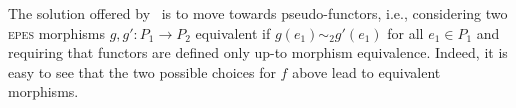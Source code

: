 \documentclass[conference]{IEEEtran}
\newcommand{\ir}[1]{\ensuremath{\mathop{\mathit{ir}({#1})}}}
\newcommand{\diff}[2]{\ensuremath{\delta({#1},{#2})}}
\newcommand{\eseqabbr}{\textsc{epes}}
\newcommand{\pred}[1]{\ensuremath{\mathit{p}({#1})}}
\newcommand{\zeveq}[0]{\ensuremath{\mathcal{E}_{eq}}}
\newcommand{\eveq}[1]{\ensuremath{\zeveq({#1})}}
\newcommand{\conf}[1]{\ensuremath{\mathit{Conf}({#1})}}
\newcommand{\zdomeq}[0]{\ensuremath{\mathcal{D}_{eq}}}
\newcommand{\domeq}[1]{\ensuremath{\zdomeq({#1})}}
\begin{document}
The solution offered by~\cite{win2017,VismeW19} is to move towards 
pseudo-functors,
i.e., considering two {\eseqabbr} morphisms $g, g' : P_1 \to P_2$ equivalent
if $g(e_1) \sim_2 g'(e_1)$ for all $e_1\in P_1$ and requiring that functors 
are defined only up-to morphism equivalence. 
%
Indeed, it is easy to see that the two possible choices for $f$ above lead to
equivalent morphisms.

  





        
\end{document}
